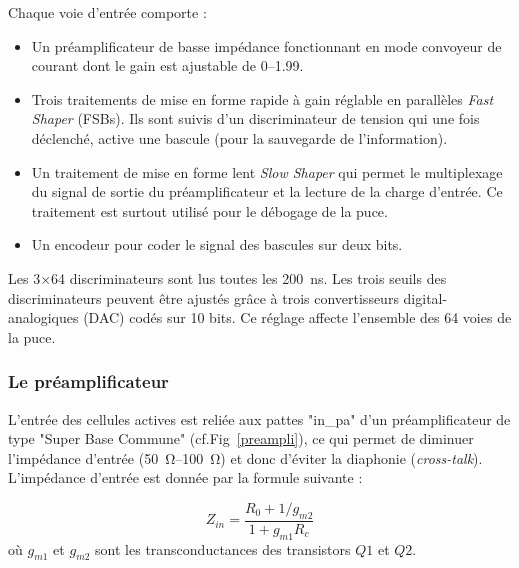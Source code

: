 Chaque voie d'entrée comporte :
\begin{itemize}[label=$\bullet$]
	\item Un préamplificateur de basse impédance fonctionnant en mode convoyeur de courant dont le gain est ajustable de \SIrange{0}{1.99}{}.
	\item Trois traitements de mise en forme rapide à gain réglable en parallèles \textit{Fast Shaper} (FSBs). Ils sont suivis d'un discriminateur de tension qui une fois déclenché, active une bascule (pour la sauvegarde de l'information).
	\item Un traitement de mise en forme lent \textit{Slow Shaper} qui permet le multiplexage du signal de sortie du préamplificateur et la lecture de la charge d'entrée. Ce traitement est surtout utilisé pour le débogage de la puce.
	\item Un encodeur pour coder le signal des bascules sur deux bits.
\end{itemize}

Les \num{3}$\times$\num{64} discriminateurs sont lus toutes les \SI{200}{\nano\second}. Les trois seuils des discriminateurs peuvent être ajustés grâce à trois convertisseurs digital-analogiques (DAC) codés sur \num{10} bits. Ce réglage affecte l'ensemble des \num{64} voies de la puce.

\subsubsection{Le préamplificateur}
L'entrée des cellules actives est reliée aux pattes "in\_pa" d'un préamplificateur de type "Super Base Commune" (cf.Fig~\ref{preampli}), ce qui permet de diminuer l'impédance d'entrée (\SIrange{50}{100}{\ohm}) et donc d'éviter la diaphonie (\textit{cross-talk}). L'impédance d'entrée est donnée par la formule suivante :

\begin{equation}
Z_{in}=\frac{R_0+1/g_{m2}}{1+g_{m1}R_c}
\end{equation}
où $g_{m1}$ et $g_{m2}$ sont les transconductances des transistors $Q1$ et $Q2$.

